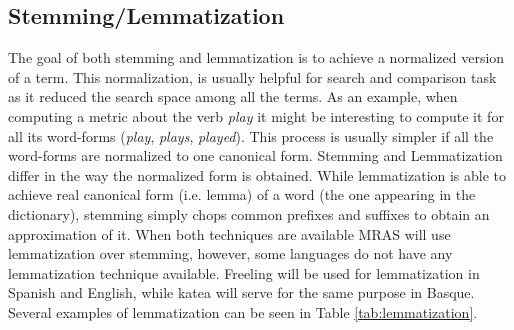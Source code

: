 \documentclass{bsu-ms}
\newcommand{\projectName}{MRAS\xspace}
\begin{document}
\subsection{Stemming/Lemmatization}
The goal of both stemming and lemmatization is to achieve a normalized version of a term. This normalization, is usually helpful for search and comparison task as it reduced the search space among all the terms. As an example, when computing a metric about the verb \emph{play} it might be interesting to compute it for all its word-forms (\emph{play}, \emph{plays}, \emph{played}). This process is usually simpler if all the word-forms are normalized to one canonical form. Stemming and Lemmatization differ in the way the normalized form is obtained. While lemmatization is able to achieve real canonical form (i.e. lemma) of a word (the one appearing in the dictionary), stemming simply chops common prefixes and suffixes to obtain an approximation of it. When both techniques are available \projectName will use lemmatization over stemming, however, some languages do not have any lemmatization technique available. Freeling will be used for lemmatization in Spanish and English, while katea will serve for the same purpose in Basque. Several examples of lemmatization can be seen in Table \ref{tab:lemmatization}.




\begin{table}[h]
\centering
{}
\caption{Example of lemmatization for different languages.}
\label{tab:lemmatization}
\end{table}
\end{document}
